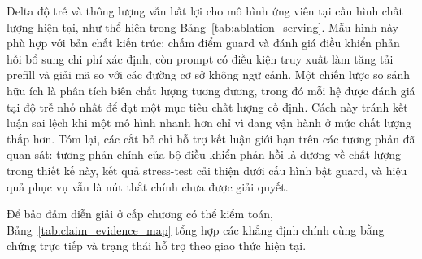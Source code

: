 ﻿\documentclass[a4paper,12pt]{article}
\begin{document}
Delta độ trễ và thông lượng vẫn bất lợi cho mô hình ứng viên tại cấu hình chất lượng hiện tại, như thể hiện trong Bảng~\ref{tab:ablation_serving}. Mẫu hình này phù hợp với bản chất kiến trúc: chấm điểm guard và đánh giá điều khiển phản hồi bổ sung chi phí xác định, còn prompt có điều kiện truy xuất làm tăng tải prefill và giải mã so với các đường cơ sở không ngữ cảnh. Một chiến lược so sánh hữu ích là phân tích biên chất lượng tương đương, trong đó mỗi hệ được đánh giá tại độ trễ nhỏ nhất để đạt một mục tiêu chất lượng cố định. Cách này tránh kết luận sai lệch khi một mô hình nhanh hơn chỉ vì đang vận hành ở mức chất lượng thấp hơn. Tóm lại, các cắt bỏ chỉ hỗ trợ kết luận giới hạn trên các tương phản đã quan sát: tương phản chính của bộ điều khiển phản hồi là dương về chất lượng trong thiết kế này, kết quả stress-test cải thiện dưới cấu hình bật guard, và hiệu quả phục vụ vẫn là nút thắt chính chưa được giải quyết.

Để bảo đảm diễn giải ở cấp chương có thể kiểm toán, Bảng~\ref{tab:claim_evidence_map} tổng hợp các khẳng định chính cùng bằng chứng trực tiếp và trạng thái hỗ trợ theo giao thức hiện tại.
\end{document}
